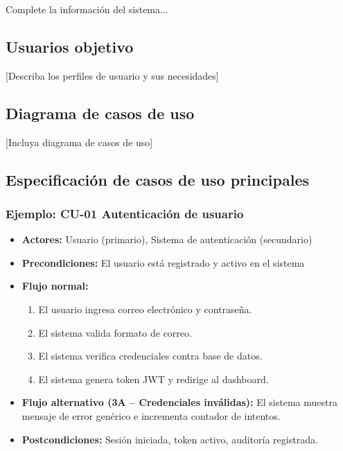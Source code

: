 \documentclass[a4paper,11pt,spanish]{article}
\begin{document}
\vspace{1em}
\noindent Complete la información del sistema...

\subsection{Usuarios objetivo}

[Describa los perfiles de usuario y sus necesidades]

\subsection{Diagrama de casos de uso}

[Incluya diagrama de casos de uso]

\subsection{Especificación de casos de uso principales}

\subsubsection*{Ejemplo: CU-01 Autenticación de usuario}

\begin{itemize}
    \item \textbf{Actores:} Usuario (primario), Sistema de autenticación (secundario)
    \item \textbf{Precondiciones:} El usuario está registrado y activo en el sistema
    \item \textbf{Flujo normal:}
    \begin{enumerate}
        \item El usuario ingresa correo electrónico y contraseña.
        \item El sistema valida formato de correo.
        \item El sistema verifica credenciales contra base de datos.
        \item El sistema genera token JWT y redirige al dashboard.
    \end{enumerate}
    \item \textbf{Flujo alternativo (3A -- Credenciales inválidas):} El sistema muestra mensaje de error genérico e incrementa contador de intentos.
    \item \textbf{Postcondiciones:} Sesión iniciada, token activo, auditoría registrada.
\end{itemize}
\end{document}
